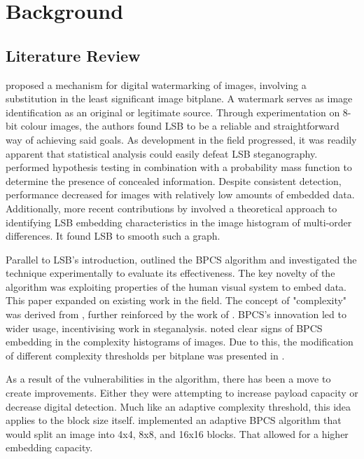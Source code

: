 \documentclass{l4proj}
\begin{document}
\chapter{Background} \label{Background}

\section{Literature Review}

\citet{Schyndel1994ADW} proposed a mechanism for digital watermarking of images, involving a substitution in the least significant image bitplane. A watermark serves as image identification as an original or legitimate source. Through experimentation on 8-bit colour images, the authors found LSB to be a reliable and straightforward way of achieving said goals. As development in the field progressed, it was readily apparent that statistical analysis could easily defeat LSB steganography.  \citet{1337281} performed hypothesis testing in combination with a probability mass function to determine the presence of concealed information. Despite consistent detection, performance decreased for images with relatively low amounts of embedded data. Additionally, more recent contributions by \cite{https://doi.org/10.1002/sec.864} involved a theoretical approach to identifying LSB embedding characteristics in the image histogram of multi-order differences. It found LSB to smooth such a graph.

Parallel to LSB's introduction, \citet{Kawaguchi1999PrinciplesAA} outlined the BPCS algorithm and investigated the technique experimentally to evaluate its effectiveness. The key novelty of the algorithm was exploiting properties of the human visual system to embed data. This paper expanded on existing work in the field. The concept of "complexity" was derived from \citet{0e8da7e9d1d74bc291f3f5edeb11d513}, further reinforced by the work of \citet{kawaguchi1997modeling}. BPCS's innovation led to wider usage, incentivising work in steganalysis. \citet{shuozhong2005statistical} noted clear signs of BPCS embedding in the complexity histograms of images. Due to this, the modification of different complexity thresholds per bitplane was presented in \citet{sun_2015}.

As a result of the vulnerabilities in the algorithm, there has been a move to create improvements. Either they were attempting to increase payload capacity or decrease digital detection. Much like an adaptive complexity threshold, this idea applies to the block size itself. \citet{Patel2014ImageSS} implemented an adaptive BPCS algorithm that would split an image into 4x4, 8x8, and 16x16 blocks. That allowed for a higher embedding capacity. 
\end{document}
